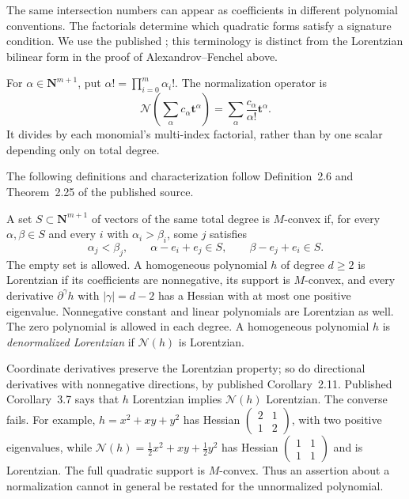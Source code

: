 The same intersection numbers can appear as coefficients in
different polynomial conventions. The factorials determine
which quadratic forms satisfy a signature condition. We use
the published \cite{BrandenHuh20Lorentzian}; this terminology
is distinct from the Lorentzian bilinear form in the proof of
Alexandrov--Fenchel above.

For $\alpha\in\mathbf N^{m+1}$, put
$\alpha!=\prod_{i=0}^m\alpha_i!$. The normalization operator is
\[
 \mathcal N\left(\sum_\alpha c_\alpha\mathbf t^\alpha\right)
      =\sum_\alpha\frac{c_\alpha}{\alpha!}\mathbf t^\alpha.
\tag{D.31}\label{eq:appD-Lorentzian-normalization}
\]
It divides by each monomial's multi-index factorial, rather
than by one scalar depending only on total degree.

The following definitions and characterization follow
Definition~2.6 and Theorem~2.25 of the published source.
\begin{definition}
\label{def:appD-Lorentzian-polynomial}
A set $S\subset\mathbf N^{m+1}$ of vectors of the same total
degree is $M$-convex if, for every $\alpha,\beta\in S$ and
every $i$ with $\alpha_i>\beta_i$, some $j$ satisfies
\[
 \alpha_j<\beta_j,\qquad
 \alpha-e_i+e_j\in S,\qquad \beta-e_j+e_i\in S.
\tag{D.32}\label{eq:appD-M-convex-exchange}
\]
The empty set is allowed. A homogeneous polynomial $h$ of
degree $d\geq2$ is Lorentzian if its coefficients are
nonnegative, its support is $M$-convex, and every derivative
$\partial^\gamma h$ with $|\gamma|=d-2$ has a Hessian with
at most one positive eigenvalue. Nonnegative constant and
linear polynomials are Lorentzian as well. The zero polynomial
is allowed in each degree. A homogeneous polynomial $h$ is
\emph{denormalized Lorentzian} if $\mathcal N(h)$ is Lorentzian.
\end{definition}

Coordinate derivatives preserve the Lorentzian property;
so do directional derivatives with nonnegative directions,
by published Corollary~2.11. Published Corollary~3.7 says
that $h$ Lorentzian implies $\mathcal N(h)$ Lorentzian.
The converse fails. For example,
$h=x^2+xy+y^2$ has Hessian
$\left(\begin{smallmatrix}2&1\\1&2\end{smallmatrix}\right)$,
with two positive eigenvalues, while
$\mathcal N(h)=\tfrac12x^2+xy+\tfrac12y^2$ has Hessian
$\left(\begin{smallmatrix}1&1\\1&1\end{smallmatrix}\right)$
and is Lorentzian. The full quadratic support is $M$-convex.
Thus an assertion about a normalization cannot in general be
restated for the unnormalized polynomial.

